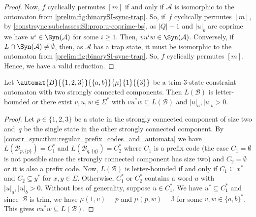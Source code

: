 \begin{proof}
	Now, $f$ cyclically permutes $[m]$
	if and only if $\mathcal A$ is isomorphic 
	to the automaton from \cref{prelim:fig:binarySI-sync-trap}.	
	So, if~$f$ cyclically permutes $[m]$, by \cref{constrsync:subclasses:SI:prop:u-coprime-bs},
	as $|Q|-1$ and $|u|_b$ are coprime
	we have $u^i \in \Syn(\mathcal A)$
	for some $i \ge 1$.
	Then, $vu^iw \in \Syn(\mathcal A)$.
	Conversely, if $L \cap \Syn(\mathcal A) \ne \emptyset$,
	then, as $\mathcal A$ has a trap state, it 
	must be isomorphic to the automaton from \cref{prelim:fig:binarySI-sync-trap}.
	So, $f$ cyclically permutes $[m]$.
	Hence, we have a valid reduction.	
\end{proof} 


\begin{lemma} \label{constrinp:lem:three-states-two-SCC}
	Let $\automat{B}{\{1,2,3\}}{\{a,b\}}{\mu}{1}{\{3\}}$
	be a trim $3$-state constraint automaton
	with two strongly connected components.
	Then $L(\mathcal B)$
	is letter-bounded
	or there exist $v,u,w \in \Sigma^*$
	with $vu^*w \subseteq L(\mathcal B)$
	and $|u|_a, |u|_b > 0$.
\end{lemma}
\begin{proof}
	Let $p \in \{1,2,3\}$
	be a state in the strongly connected component
	of size two and~$q$
	be the single state in the other strongly connected component.
	By \cref{constr_sync:thm:regular_prefix_codes_and_automata}
	we have $L(\mathcal B_{p,\{p\}}) = C_1^*$
	and $L(\mathcal B_{q,\{q\}}) = C_2^*$
	where $C_1$ is a prefix code (the case $C_1 = \emptyset$ is not possible
	since the strongly connected component has size two)
	and $C_2 = \emptyset$ or it is also a prefix code.
	Now, $L(\mathcal B)$
	is letter-bounded if and only if $C_1 \subseteq x^*$
	and $C_2 \subseteq y^*$ for $x,y \in \Sigma$.
	Otherwise, $C_1^*$ or $C_2^*$
	contains a word $u$
	with $|u|_a, |u|_b > 0$.
	Without loss of generality, suppose $u \in C_1^*$.
	We have $u^* \subseteq C_1^*$
	and since~$\mathcal B$
	is trim,
	we have $\mu(1, v) = p$
	and $\mu(p, w) = 3$
	for some $v,w \in \{a,b\}^*$.
	This gives $vu^*w \subseteq L(\mathcal B)$.
\end{proof}

